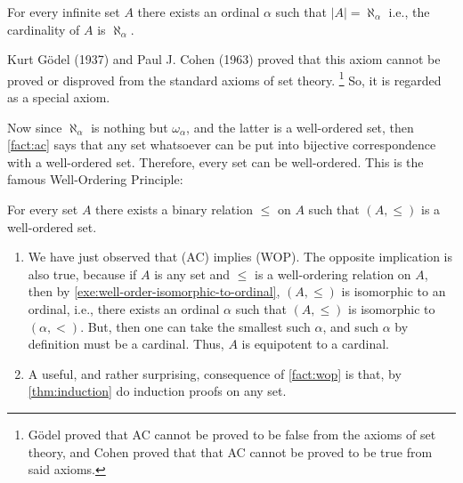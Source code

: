 \begin{fact}
  \label{fact:ac}
  For every infinite set $A$ there exists an ordinal $\alpha$ such that $|A|=\aleph_\alpha$ i.e.,  the cardinality of $A$ is $\aleph_\alpha$.
\end{fact}

Kurt Gödel (1937) and Paul J. Cohen (1963) proved that this axiom cannot be proved or disproved from the standard  axioms of set theory.%
\footnote{Gödel proved that AC cannot be proved to be false from the axioms of set theory, and Cohen proved that that AC cannot be proved to be true from said axioms.}
So, it is regarded as a special axiom.

Now since $\aleph_\alpha$ is nothing but $\omega_\alpha$, and the latter is a well-ordered set, then \cref{fact:ac} says that any set whatsoever can be put into bijective correspondence with a well-ordered set.
Therefore, every set can be well-ordered.
This is the famous Well-Ordering Principle:

\begin{fact}
  \label{fact:wop}
  For every set $A$ there exists a binary relation $\le$ on $A$ such that $(A,\le )$ is a well-ordered set.
\end{fact}

\begin{remarks}

  \begin{enumerate}
  \item
    We have just observed that (AC) implies (WOP).
    The opposite implication is also true, because if
    $A$ is any set and $\le$ is a well-ordering relation on $A$, then by \cref{exe:well-order-isomorphic-to-ordinal}, $(A,\le )$ is isomorphic to an ordinal, i.e., there exists an ordinal $\alpha$ such that $(A,\le )$ is isomorphic to $(\alpha,<)$.
    But, then one can take the smallest such $\alpha$, and such $\alpha$ by definition must be a cardinal.
    Thus, $A$ is equipotent to a cardinal.

  \item
    A useful, and rather surprising,  consequence of \cref{fact:wop} is that, by \ref{thm:induction} do induction proofs on any set.
  \end{enumerate}

\end{remarks}

